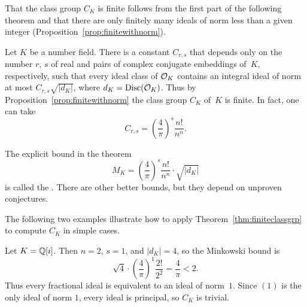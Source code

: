 That the class group $C_K$ is finite follows from the first part of
the following theorem and that there are only finitely many
ideals of norm less than a given integer (Proposition~\ref{prop:finitewithnorm}).
\begin{theorem}\label{thm:finiteclassgrp}
	Let $K$ be a number field.  There is a constant $C_{r,s}$ that
	depends only on the number $r$, $s$ of real and pairs
	of complex conjugate embeddings of~$K$, respectively, such that
	every ideal class of $\mathcal{O}_K$ contains an integral ideal
	of norm at most $C_{r,s}\sqrt{|d_K|}$, where $d_K=\operatorname{Disc}(\mathcal{O}_K)$.
	Thus by Proposition~\ref{prop:finitewithnorm}
	the class group $C_K$ of~$K$ is finite. In fact, one can take
	$$
		C_{r,s} = \left(\frac{4}{\pi}\right)^s\frac{n!}{n^n}.
	$$
\end{theorem}
The explicit bound in the theorem
$$
	M_K = \left(\frac{4}{\pi}\right)^s\frac{n!}{n^n} \cdot \sqrt{|d_K|}
$$
is called the .
There are other better bounds, but they depend on unproven conjectures. %

The following two examples illustrate how to apply
Theorem~\ref{thm:finiteclassgrp} to compute $C_K$ in simple cases.
\begin{example}
	Let $K=\mathbb{Q}[i]$.  Then $n=2$, $s=1$, and $|d_K|=4$, so the Minkowski bound is
	$$
		\sqrt{4} \cdot \left(\frac{4}{\pi}\right)^1 \frac{2!}{2^2}
		= \frac{4}{\pi} < 2.
	$$
	Thus every fractional ideal is equivalent to an ideal of norm~$1$.
	Since $(1)$ is the only ideal of norm $1$, every ideal is principal,
	so $C_K$ is trivial.
\end{example}


